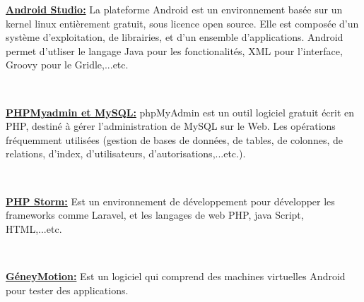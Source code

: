 \documentclass[french,a4,12pt]{report}
\begin{document}
	\begin{itemize}%
		\begin{minipage}{0.5\textwidth}
	\item{ \underline{ \textbf{Android Studio:}}}	
La plateforme Android est un environnement basée sur un kernel linux entièrement gratuit, sous licence open source. Elle est composée d'un système d'exploitation, de librairies, et d'un ensemble d'applications. Android permet d'utliser le langage Java pour les fonctionalités,  XML pour l'interface, Groovy pour le Gridle,...etc.
		\end{minipage}
			 ~	


\begin{minipage}{0.5\textwidth}
\item{ \underline{ \textbf{PHPMyadmin et MySQL:}}}
         	phpMyAdmin est un outil logiciel gratuit écrit en PHP, destiné à gérer l'administration de MySQL sur le Web.  Les opérations fréquemment utilisées (gestion de bases de données, de tables, de colonnes, de relations, d'index, d'utilisateurs, d'autorisations,...etc.).
         \end{minipage}
          ~      

                 
\begin{minipage}{0.5\textwidth}
\item{ \underline{ \textbf{PHP Storm:}}}
Est un  environnement de développement pour développer les frameworks comme Laravel, et les langages de web PHP, java Script, HTML,...etc.
\end{minipage}
~

\begin{minipage}{0.5\textwidth}
		\item{ \underline{ \textbf{GéneyMotion:}}}
Est un logiciel qui comprend des machines virtuelles Android pour tester des applications. 
\end{minipage}
~



\end{itemize}
\end{document}
